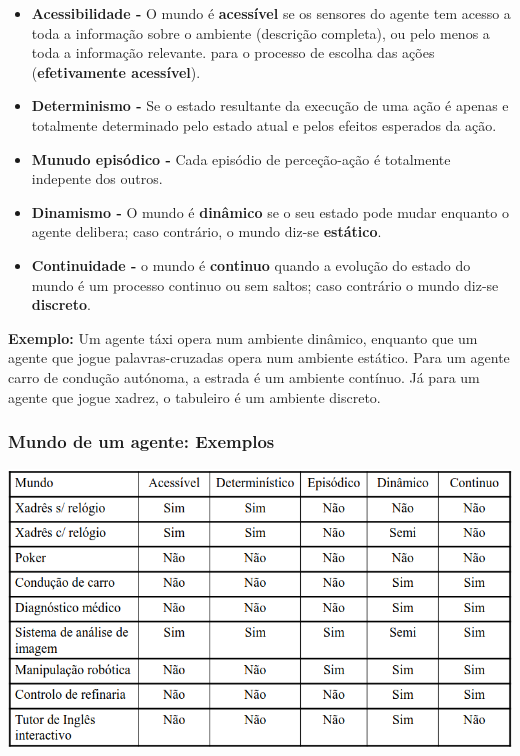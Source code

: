 \documentclass{article}
\begin{document}
\begin{itemize}
  \item \textbf{Acessibilidade -} O mundo é \textbf{acessível} se os sensores do agente tem acesso a toda a informação sobre o ambiente
  (descrição completa), ou pelo menos a toda a informação relevante.
  para o processo de escolha das ações (\textbf{efetivamente acessível}).
  \item \textbf{Determinismo -} Se o estado resultante da
  execução de uma ação é apenas e totalmente determinado pelo estado atual e pelos efeitos esperados
  da ação.
  \item \textbf{Munudo episódico -} Cada episódio de perceção-ação é totalmente indepente dos outros.
  \item \textbf{Dinamismo -}  O mundo é \textbf{dinâmico} se o seu estado pode mudar
  enquanto o agente delibera; caso contrário, o mundo diz-se \textbf{estático}.
  \item \textbf{Continuidade -} o mundo é \textbf{continuo} quando a evolução do estado do
  mundo é um processo continuo ou sem saltos; caso contrário o mundo
  diz-se \textbf{discreto}.
\end{itemize}

\begin{flushleft}
  \textbf{Exemplo:} Um agente táxi opera num ambiente dinâmico, enquanto que um agente que jogue palavras-cruzadas opera num
  ambiente estático.
  Para um agente carro de condução autónoma, a estrada é um ambiente contínuo. Já para um agente que jogue xadrez,
  o tabuleiro é um ambiente discreto.
\end{flushleft}

\pagebreak

\subsubsection{Mundo de um agente: Exemplos}

\begin{center}
  \includegraphics[scale=0.35]{16}
\end{center}
\end{document}
